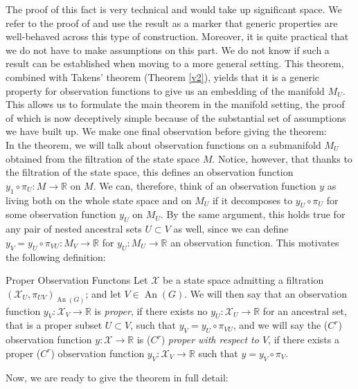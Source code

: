 \documentclass[11pt, a4paper]{memoir}
\theoremstyle{break}
\theoremstyle{break}
\theoremstyle{nonumberplain}
\newcommand{\mR}{\mathbb{R}}
\DeclareMathOperator{\an}{An}
\begin{document}
The proof of this fact is very technical and would take up significant space. We refer to the proof of \cite{mathFound} and use the result as a marker that generic properties are well-behaved across this type of construction. Moreover, it is quite practical that we do not have to make assumptions on this part. We do not know if such a result can be established when moving to a more general setting. This theorem, combined with Takens' theorem (Theorem \ref{v2}), yields that it is a generic property for observation functions to give us an embedding of the manifold $M_U$. This allows us to formulate the main theorem in the manifold setting, the proof of which is now deceptively simple because of the substantial set of assumptions we have built up. We make one final observation before giving the theorem:\\[5pt]
In the theorem, we will talk about observation functions on a submanifold $M_U$ obtained from the filtration of the state space $M$. Notice, however, that thanks to the filtration of the state space, this defines an observation function $y_1\circ\pi_U:M\to \mR$ on $M$. We can, therefore, think of an observation function $y$ as living both on the whole state space and on $M_U$ if it decomposes to $y_U\circ \pi_{U}$ for some observation function $y_U$ on $M_U$. By the same argument, this holds true for any pair of nested ancestral sets $U\subset V$ as well, since we can define $y_V=y_U\circ \pi_{VU}:M_V\to \mR$ for $y_U:M_U\to \mR$ an observation function. This motivates the following definition:
\begin{mydefinition}{Proper Observation Functons}
Let $\mathcal{X}$ be a state space admitting a filtration $(\mathcal{X}_U, \pi_{UV})_{\an(G)}$; and let $V\in \an(G)$. We will then say that an observation function $y_V:\mathcal{X}_V\to \mR$ is \emph{proper}, if there exists no $y_U:\mathcal{X}_U\to \mR$ for an ancestral set, that is a proper subset $U\subset V$, such that $y_V=y_U\circ\pi_{VU}$, and we will say the ($C^r$) observation function $y:\mathcal{X}\to \mR$ is ($C^r$) \emph{proper with respect to $V$}, if there exists a proper ($C^r$) observation function $y_V:\mathcal{X}_V\to \mR$ such that $y=y_V\circ\pi_V$.
\end{mydefinition}
Now, we are ready to give the theorem in full detail:
\end{document}
